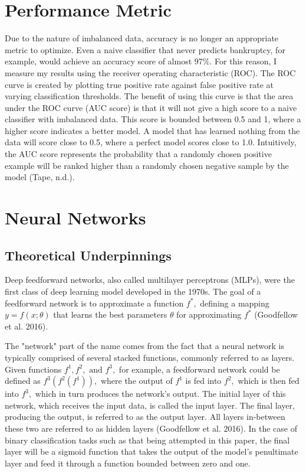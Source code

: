 \documentclass[12pt]{article}  %
\theoremstyle{definition}
\theoremstyle{remark}
\begin{document}
\section{Performance Metric}
\par Due to the nature of imbalanced data, accuracy is no longer an appropriate metric to optimize. Even a naive classifier that never predicts bankruptcy, for example, would achieve an accuracy score of almost 97\%. For this reason, I measure my results using the receiver operating characteristic (ROC). The ROC curve is created by plotting true positive rate against false positive rate at varying classification thresholds. The benefit of using this curve is that the area under the ROC curve (AUC score) is that it will not give a high score to a naive classifier with imbalanced data. This score is bounded between 0.5 and 1, where a higher score indicates a better model. A model that has learned nothing from the data will score close to 0.5, where a perfect model scores close to 1.0.  Intuitively, the AUC score represents the probability that a randomly chosen positive example will be ranked higher than a randomly chosen negative sample by the model (Tape, n.d.).

\section{Neural Networks}
\subsection{Theoretical Underpinnings}
\par Deep feedforward networks, also called multilayer perceptrons (MLPs), were the first class of deep learning model developed in the 1970s.  The goal of a feedforward network is to approximate a function $f^{*},$ defining a mapping $y=f(x;\theta)$ that learns the best parameters $\theta$ for approximating $f^{*}$ (Goodfellow et al. 2016). 

\par The "network" part of the name comes from the fact that a neural network is typically comprised of several stacked functions, commonly referred to as layers. Given functions $f^{1}, f^{2}, \text{ and } f^{3},$ for example, a feedforward network could be defined as $f^{3}(f^{2}(f^{1})),$ where the output of $f^{1}$ is fed into $f^{2},$ which is then fed into $f^{3},$ which in turn produces the network's output. The initial layer of this network, which receives the input data, is called the input layer. The final layer, producing the output, is referred to as the output layer. All layers in-between these two are referred to as hidden layers (Goodfellow et al. 2016). In the case of binary classification tasks such as that being attempted in this paper, the final layer will be a sigmoid function that takes the output of the model's penultimate layer and feed it through a function bounded between zero and one. 
\end{document}
